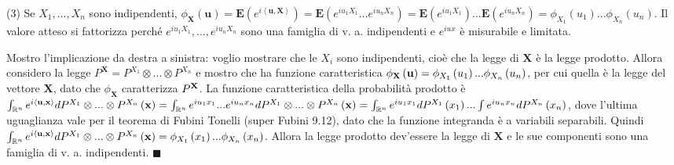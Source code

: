 \documentclass{article}
\begin{document}
(3) Se $X_{1},...,X_{n}$ sono indipendenti, $\phi _{\mathbf{X}}\left( 
\mathbf{u}\right) =\mathbf{E}\left( e^{i\left\langle \mathbf{u,X}%
\right\rangle }\right) =\mathbf{E}\left(
e^{iu_{1}X_{1}}...e^{iu_{n}X_{n}}\right) =\mathbf{E}\left(
e^{iu_{1}X_{1}}\right) ...\mathbf{E}\left( e^{iu_{n}X_{n}}\right) =\phi
_{X_{1}}\left( u_{1}\right) ...\phi _{X_{n}}\left( u_{n}\right) $. Il valore
atteso si fattorizza perch\'{e} $e^{iu_{1}X_{1}},...,e^{iu_{n}X_{n}}$ sono
una famiglia di v. a. indipendenti e $e^{iux}$ \`{e} misurabile e limitata.

Mostro l'implicazione da destra a sinistra: voglio mostrare che le $X_{i}$
sono indipendenti, cio\`{e} che la legge di $\mathbf{X}$ \`{e} la legge
prodotto. Allora considero la legge $P^{\mathbf{X}}=P^{X_{1}}\otimes
...\otimes P^{X_{n}}$ e mostro che ha funzione caratteristica $\phi _{%
\mathbf{X}}\left( \mathbf{u}\right) =\phi _{X_{1}}\left( u_{1}\right)
...\phi _{X_{n}}\left( u_{n}\right) $, per cui quella \`{e} la legge del
vettore $\mathbf{X}$, dato che $\phi _{\mathbf{X}}$ caratterizza $P^{\mathbf{%
X}}$. La funzione caratteristica della probabilit\`{a} prodotto \`{e} $\int_{%
\mathbb{R}
^{n}}e^{i\left\langle \mathbf{u,x}\right\rangle }dP^{X_{1}}\otimes
...\otimes P^{X_{n}}\left( \mathbf{x}\right) =\int_{%
\mathbb{R}
^{n}}e^{iu_{1}x_{1}}...e^{iu_{n}x_{n}}dP^{X_{1}}\otimes ...\otimes
P^{X_{n}}\left( \mathbf{x}\right) =\int_{%
\mathbb{R}
^{n}}e^{iu_{1}x_{1}}dP^{X_{1}}\left( x_{1}\right) ...\int
e^{iu_{n}x_{n}}dP^{X_{n}}\left( x_{n}\right) $, dove l'ultima uguaglianza
vale per il teorema di Fubini Tonelli (super Fubini 9.12), dato che la
funzione integranda \`{e} a variabili separabili. Quindi $\int_{%
\mathbb{R}
^{n}}e^{i\left\langle \mathbf{u,x}\right\rangle }dP^{X_{1}}\otimes
...\otimes P^{X_{n}}\left( \mathbf{x}\right) =\phi _{X_{1}}\left(
x_{1}\right) ...\phi _{X_{n}}\left( x_{n}\right) $. Allora la legge prodotto
dev'essere la legge di $\mathbf{X}$ e le sue componenti sono una famiglia di
v. a. indipendenti. $\blacksquare $
\end{document}
